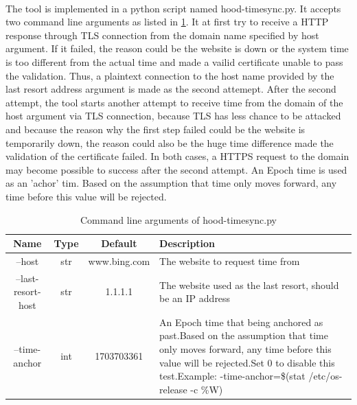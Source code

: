 \documentclass[mscthesis]{usiinfthesis}
\begin{document}
\paragraph{}
The tool is implemented in a python script named hood-timesync.py. It accepts two command line arguments as listed in \cref{tab:timesync_cmdarg}. It at first try to receive a HTTP response through TLS connection from the domain name specified by host argument. If it failed, the reason could be the website is down or the system time is too different from the actual time and made a vailid certificate unable to pass the validation. Thus, a plaintext connection to the host name provided by the last resort address argument is made as the second attemept. After the second attempt, the tool starts another attempt to receive time from the domain of the host argument via TLS connection, because TLS has less chance to be attacked and because the reason why the first step failed could be the website is temporarily down, the reason could also be the huge time difference made the validation of the certificate failed. In both cases, a HTTPS request to the domain may become possible to success after the second attempt. An Epoch time is used as an 'achor' tim. Based on the assumption that time only moves forward, any time before this value will be rejected.

\begin{table}[H]
  \centering
  \begin{tabular}{|c|c|c|m{68mm}|}
    \hline
    Name               & Type & Default      & Description                                                                                                                                                                                                                                               \\
    \hline
    --host             & str  & www.bing.com & The website to request time from                                                                                                                                                                                                                          \\
    --last-resort-host & str  & 1.1.1.1      & The website used as the last resort, should be an IP address                                                                                                                                                                                              \\
    --time-anchor      & int  & 1703703361   & An Epoch time that being anchored as past.\newline Based on the assumption that time only moves forward, any time before this value will be rejected.\newline Set 0 to disable this test.\newline Example: -\-time-anchor=\$(stat /etc/os-release -c \%W) \\
    \hline
  \end{tabular}
  \caption{Command line arguments of hood-timesync.py}
  \label{tab:timesync_cmdarg}
\end{table}
\end{document}
